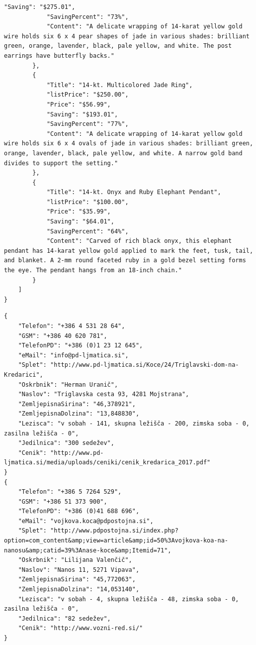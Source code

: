 \documentclass[runningheads]{llncs}
\begin{document}
\begin{lstlisting}[caption={Results for jewlary website},captionpos=b, label={lst:label2}]
            "Saving": "$275.01",
            "SavingPercent": "73%",
            "Content": "A delicate wrapping of 14-karat yellow gold wire holds six 6 x 4 pear shapes of jade in various shades: brilliant green, orange, lavender, black, pale yellow, and white. The post earrings have butterfly backs."
        },
        {
            "Title": "14-kt. Multicolored Jade Ring",
            "listPrice": "$250.00",
            "Price": "$56.99",
            "Saving": "$193.01",
            "SavingPercent": "77%",
            "Content": "A delicate wrapping of 14-karat yellow gold wire holds six 6 x 4 ovals of jade in various shades: brilliant green, orange, lavender, black, pale yellow, and white. A narrow gold band divides to support the setting."
        },
        {
            "Title": "14-kt. Onyx and Ruby Elephant Pendant",
            "listPrice": "$100.00",
            "Price": "$35.99",
            "Saving": "$64.01",
            "SavingPercent": "64%",
            "Content": "Carved of rich black onyx, this elephant pendant has 14-karat yellow gold applied to mark the feet, tusk, tail, and blanket. A 2-mm round faceted ruby in a gold bezel setting forms the eye. The pendant hangs from an 18-inch chain."
        }
    ]
}

\end{lstlisting}

\begin{lstlisting}[caption={Results for PZS website},captionpos=b, label={lst:label3}]
{
    "Telefon": "+386 4 531 28 64",
    "GSM": "+386 40 620 781",
    "TelefonPD": "+386 (0)1 23 12 645",
    "eMail": "info@pd-ljmatica.si",
    "Splet": "http://www.pd-ljmatica.si/Koce/24/Triglavski-dom-na-Kredarici",
    "Oskrbnik": "Herman Uranič",
    "Naslov": "Triglavska cesta 93, 4281 Mojstrana",
    "ZemljepisnaSirina": "46,378921",
    "ZemljepisnaDolzina": "13,848830",
    "Lezisca": "v sobah - 141, skupna ležišča - 200, zimska soba - 0, zasilna ležišča - 0",
    "Jedilnica": "300 sedežev",
    "Cenik": "http://www.pd-ljmatica.si/media/uploads/ceniki/cenik_kredarica_2017.pdf"
}
{
    "Telefon": "+386 5 7264 529",
    "GSM": "+386 51 373 900",
    "TelefonPD": "+386 (0)41 688 696",
    "eMail": "vojkova.koca@pdpostojna.si",
    "Splet": "http://www.pdpostojna.si/index.php?option=com_content&amp;view=article&amp;id=50%3Avojkova-koa-na-nanosu&amp;catid=39%3Anase-koce&amp;Itemid=71",
    "Oskrbnik": "Lilijana Valenčič",
    "Naslov": "Nanos 11, 5271 Vipava",
    "ZemljepisnaSirina": "45,772063",
    "ZemljepisnaDolzina": "14,053140",
    "Lezisca": "v sobah - 4, skupna ležišča - 48, zimska soba - 0, zasilna ležišča - 0",
    "Jedilnica": "82 sedežev",
    "Cenik": "http://www.vozni-red.si/"
}

\end{lstlisting}
\end{document}
